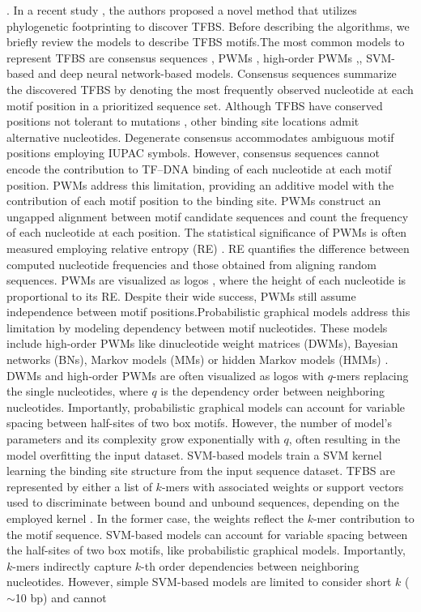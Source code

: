 \documentclass[a4paper, titlepage, openright]{book}
\begin{document}
\citep{balazadeh2011ors1, xu2012cis,katara2012phylogenetic}. In a recent study \citep{glenwinkel2014targetortho},  the authors proposed a novel method that utilizes phylogenetic footprinting to discover TFBS. Before describing the algorithms, we briefly review the models to describe TFBS motifs.The most common models to represent TFBS are consensus sequences  \citep{day1992critical}, PWMs \citep{stormo2000dna,stormo2013modeling},  high-order PWMs \citep{siddharthan2010dinucleotide,korhonen2017fast},, SVM-based  \citep{gorkin2012integration} and deep neural network-based  \citep{he2021survey} models. Consensus sequences summarize the discovered TFBS by denoting the most frequently observed nucleotide at each motif position in a prioritized sequence set. Although TFBS have conserved positions not tolerant to mutations \citep{li2015human}, other binding site locations admit alternative nucleotides. Degenerate consensus accommodates ambiguous motif positions employing IUPAC symbols. However, consensus sequences cannot encode the contribution to TF–DNA binding of each nucleotide at each motif position. PWMs address this limitation, providing an additive model with the contribution of each motif position to the binding site. PWMs construct an ungapped alignment between motif candidate sequences and count the frequency of each nucleotide at each position. The statistical significance of PWMs is often measured employing relative entropy (RE) \citep{stormo1998information}. RE quantifies the difference between computed nucleotide frequencies and those obtained from aligning random sequences. PWMs are visualized as logos \citep{schneider1990sequence}, where the height of each nucleotide is proportional to its RE. Despite their wide success, PWMs still assume independence between motif positions.Probabilistic graphical models address this limitation by modeling dependency between motif nucleotides. These models include high-order PWMs like dinucleotide weight matrices (DWMs), Bayesian networks (BNs), Markov models (MMs) or hidden Markov models (HMMs) \citep{siddharthan2010dinucleotide, korhonen2017fast, barash2003modeling, siebert2016bayesian}. DWMs and high-order PWMs are often visualized as logos with $q$-mers replacing the single nucleotides, where $q$ is the dependency order between neighboring nucleotides. Importantly, probabilistic graphical models can account for variable spacing between half-sites of two box motifs. However, the number of model’s parameters and its complexity grow exponentially with $q$, often resulting in the model overfitting the input dataset. SVM-based models train a SVM kernel learning the binding site structure from the input sequence dataset. TFBS are represented by either a list of $k$-mers with associated weights or support vectors used to discriminate between bound and unbound sequences, depending on the employed kernel \citep{boeva2016analysis}. In the former case, the weights reflect the $k$-mer contribution to the motif sequence. SVM-based models can account for variable spacing between the half-sites of two box motifs, like probabilistic graphical models. Importantly, $k$-mers indirectly capture $k$-th order dependencies between neighboring nucleotides. However, simple SVM-based models are limited to consider short $k$ ($\sim$10 bp) and cannot 
\end{document}
